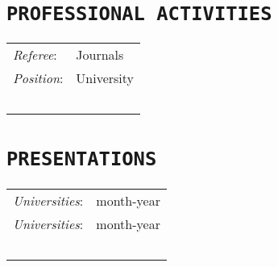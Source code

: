 \documentclass{sty/CV_Class}
\begin{document}

\section{\texttt{PROFESSIONAL ACTIVITIES}}
\begin{tabular}{ l l }
 \textit{Referee}: & Journals \\ [0.5em]
 \textit{Position}: & University \\~\\
\end{tabular}


\section{\texttt{PRESENTATIONS}}
\begin{tabular}{ l l }
 \textit{Universities}: &  \hfill month-year \\ [0.5em]
 \textit{Universities}: & \hfill month-year \\~\\
\end{tabular}
\end{document}
